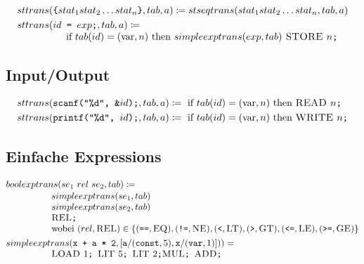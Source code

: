\documentclass[ngerman,a4paper, 12pt, fleqn]{article}
\newcommand{\defeq}{\coloneqq}
\newcommand{\befehl}[1]{\textsc{#1}}
\begin{document}
	\begin{align*}		%
		&sttrans(\texttt{\{} stat_1 stat_2 \dots stat_n \texttt{\}}, tab, a) \defeq stseqtrans(stat_1 stat_2 \dots stat_n , tab, a) \\
		&sttrans(id \texttt{ = } exp\texttt{;}, tab, a) \defeq \\[-3pt]
		&\hspace{5em} \text{if } tab(id) = (\operatorname{var}, n) \text{ then } simpleexptrans(exp, tab) \befehl{ STORE } n\texttt{;}
	\end{align*}

	\subsection*{Input/Output}
	\begin{align*}
		&sttrans(\texttt{scanf("\%d", \&}id\texttt{);}, tab, a) \defeq \text{ if } tab(id) = (\operatorname{var}, n) \text{ then } \befehl{READ } n\texttt{;} \\
		&sttrans(\texttt{printf("\%d", } id\texttt{);}, tab, a) \defeq \text{ if } tab(id) = (\operatorname{var}, n) \text{ then } \befehl{WRITE } n\texttt{;}
	\end{align*}

 	\subsection*{Einfache Expressions}
	
	\begin{align*}
		&boolexptrans(se_1 \ rel \ se_2, tab) \defeq \\[-3pt]
		&\hspace{5em}\begin{aligned}
			&simpleexptrans(se_1 , tab) \\[-3pt]
			&simpleexptrans(se_2 , tab) \\[-3pt]
			&\befehl{REL}\texttt{;} \\[-3pt]
			&\text{wobei } (rel , \befehl{REL}) \in \{ (\texttt{==}, \befehl{EQ}), (\texttt{!=}, \befehl{NE}), (\texttt{<}, \befehl{LT}), (\texttt{>}, \befehl{GT}), (\texttt{<=}, \befehl{LE}), (\texttt{>=}, \befehl{GE}) \} 
		\end{aligned} \\	
		&simpleexptrans(\texttt{x + a * 2}, [\texttt{a}/(\texttt{const}, 5), \texttt{x}/(\texttt{var}, 1)])) = \\[-3pt]
		& \hspace{5em}
		\befehl{LOAD } 1\texttt{; } \befehl{LIT } 5 \texttt{; } \befehl{LIT } 2 \texttt{;} \befehl{MUL} \texttt{; } \befehl{ADD} \texttt{;}	
	\end{align*}
\end{document}

